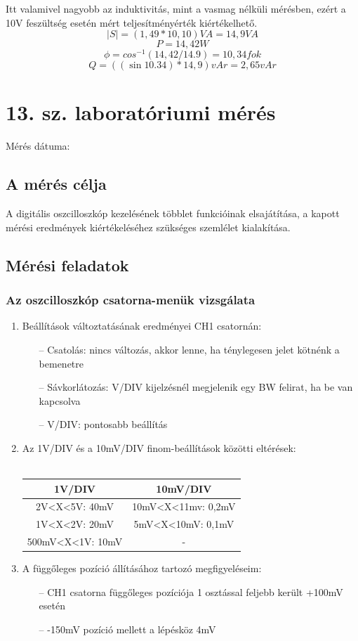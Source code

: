 \documentclass[10pt,a4paper]{article}
\begin{document}
Itt valamivel nagyobb az induktivitás, mint a vasmag nélküli mérésben, ezért a 10V feszültség esetén mért teljesítményérték kiértékelhető.
$$\left|S\right| = \left(1,49*10,10\right)VA = 14,9 VA$$
$$P = 14,42 W$$
$$\phi = cos^{-1}\left(14,42/14.9\right) = 10,34 fok$$
$$Q = \left(\left(\sin 10.34\right)*14,9\right)vAr = 2,65 vAr$$
\section{13. sz. laboratóriumi mérés}
	Mérés dátuma:\date{2016.09.13}
	\subsection{A mérés célja}
	A digitális oszcilloszkóp kezelésének többlet funkcióinak
elsajátítása, a kapott mérési eredmények kiértékeléséhez
szükséges szemlélet kialakítása.
	\subsection{Mérési feladatok}
		\subsubsection{Az oszcilloszkóp csatorna-menük vizsgálata}
		\begin{enumerate}
			\item Beállítások változtatásának eredményei CH1 csatornán:
				\begin{itemize}
					\item[--] Csatolás: nincs változás, akkor lenne, ha ténylegesen jelet kötnénk a bemenetre
					\item[--] Sávkorlátozás: V/DIV kijelzésnél megjelenik egy BW felirat, ha be van kapcsolva
					\item[--] V/DIV: pontosabb beállítás
				\end{itemize}
			\item Az 1V/DIV és a 10mV/DIV finom-beállítások közötti eltérések:\\\\
			\begin{tabular}{|c|c|}
			\hline 
			1V/DIV & 10mV/DIV \\ 
			\hline 
			2V<X<5V: 40mV & 10mV<X<11mv: 0,2mV \\ 
			\hline 
			1V<X<2V: 20mV & 5mV<X<10mV: 0,1mV \\ 
			\hline 
			500mV<X<1V: 10mV & - \\ 
			\hline 
			\end{tabular}
			\item A függőleges pozíció állításához tartozó megfigyeléseim:
				\begin{itemize}
					\item[--] CH1 csatorna függőleges pozíciója 1 osztással feljebb került +100mV esetén
					\item[--] -150mV pozíció mellett a lépésköz 4mV
				\end{itemize}				 
		\end{enumerate}
\end{document}
